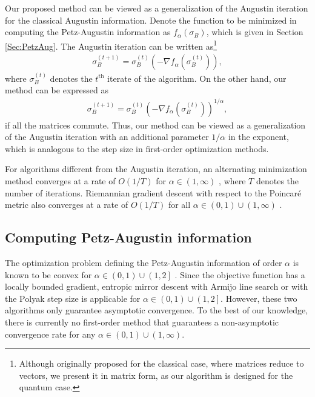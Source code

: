 \documentclass{article}
\begin{document}
Our proposed method can be viewed as a generalization of the Augustin iteration for the classical Augustin information.
Denote the function to be minimized in computing the Petz-Augustin information as $f_{\alpha}(\sigma_B)$, which is given in Section \ref{Sec:PetzAug}.
The Augustin iteration can be written as\footnote{Although originally proposed for the classical case, where matrices reduce to vectors, we present it in matrix form, as our algorithm is designed for the quantum case.}
\begin{align}
    \sigma_B^{(t+1)}=\sigma_B^{(t)} \left(-\nabla f_{\alpha}\left(\sigma_B^{(t)}\right)\right),
\end{align}
where $\sigma_B^{(t)}$ denotes the $t^{\text{th}}$ iterate of the algorithm.
On the other hand, our method can be expressed as 
\begin{align}
    \sigma_B^{(t+1)}=\sigma_B^{(t)} \left(-\nabla f_{\alpha}\left(\sigma_B^{(t)}\right)\right)^{1/\alpha},
\end{align}
if all the matrices commute. 
Thus, our method can be viewed as a generalization of the Augustin iteration with an additional parameter $1/\alpha$ in the exponent, which is analogous to the step size in first-order optimization methods. 

For algorithms different from the Augustin iteration, an alternating minimization method \cite{Kamatsuka2024} converges at a rate of $O(1/T)$ for $\alpha\in(1,\infty)$ \cite{Tsai2024}, where $T$ denotes the number of iterations. 
Riemannian gradient descent with respect to the Poincar{\'e} metric %
also converges at a rate of $O(1/T)$ for all $\alpha\in(0,1)\cup(1,\infty)$ \cite{Wang2024}.

\subsection{Computing Petz-Augustin information}
The optimization problem defining the Petz-Augustin information of order $\alpha$ is known to be convex for $\alpha\in(0,1)\cup\left(1,2\right]$ \cite{Mosonyi2017}.
Since the objective function has a locally bounded gradient, entropic mirror descent with Armijo line search \cite{Li2019a} or with the Polyak step size \cite{You2022} is applicable for $\alpha\in(0,1)\cup\left(1,2\right]$. 
However, these two algorithms only guarantee asymptotic convergence. 
To the best of our knowledge, there is currently no 
first-order method
that guarantees a non-asymptotic convergence rate for any $\alpha\in(0,1)\cup(1,\infty)$.
\end{document}

